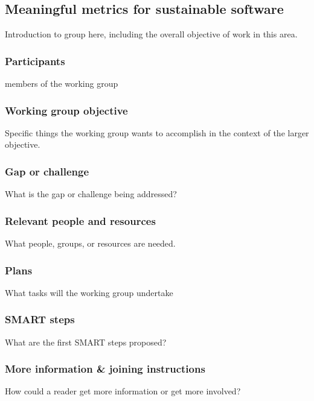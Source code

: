 \subsection{Meaningful metrics for sustainable software}
\label{sec:metrics}


Introduction to group here, including the overall objective of work in this area.

\subsubsection{Participants}

members of the working group

\subsubsection{Working group objective}

Specific things the working group wants to accomplish in the context of the larger objective.

\subsubsection{Gap or challenge}

What is the gap or challenge being addressed?

\subsubsection{Relevant people and resources}

What people, groups, or resources are needed.

\subsubsection{Plans}

What tasks will the working group undertake

\subsubsection{SMART steps}

What are the first SMART steps proposed?

\subsubsection{More information \& joining instructions}

How could a reader get more information or get more involved?